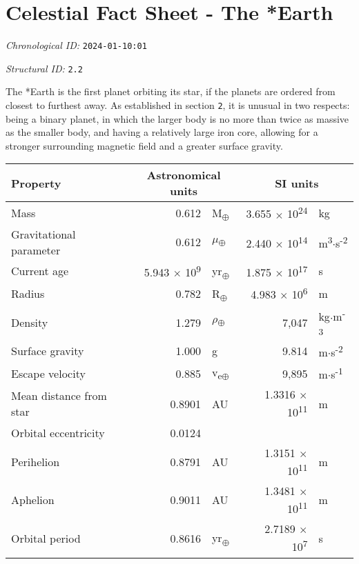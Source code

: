 \section{Celestial Fact Sheet - The *Earth}
\emph{Chronological ID:} \texttt{2024-01-10:01}

\emph{Structural ID:} \texttt{2.2}

The *Earth is the first planet orbiting its star, if the planets are ordered from closest to furthest away. As established in section \texttt{2}, it is unusual in two respects: being a binary planet, in which the larger body is no more than twice as massive as the smaller body, and having a relatively large iron core, allowing for a stronger surrounding magnetic field and a greater surface gravity.

\begin{tabular}{|p{4cm}|r l|r l|}
  \hline
  Property & \multicolumn{2}{c|}{Astronomical units} & \multicolumn{2}{c|}{SI units} \\
  \hline \hline
  Mass & 0.612 & M\textsubscript{$\oplus$} & 3.655 $\times$ 10\textsuperscript{24} & kg \\
  Gravitational parameter & 0.612 & $\mu$\textsubscript{$\oplus$} & 2.440 $\times$ 10\textsuperscript{14} & m\textsuperscript{3}$\cdot$s\textsuperscript{-2} \\
  Current age & 5.943 $\times$ 10\textsuperscript{9} & yr\textsubscript{$\oplus$} & 1.875 $\times$ 10\textsuperscript{17} & s \\
  Radius & 0.782 & R\textsubscript{$\oplus$} & 4.983 $\times$ 10\textsuperscript{6} & m \\
  Density & 1.279 & $\rho$\textsubscript{$\oplus$} & 7,047 & kg$\cdot$m\textsuperscript{-3} \\
  Surface gravity & 1.000 & g & 9.814 & m$\cdot$s\textsuperscript{-2} \\
  Escape velocity & 0.885 & v\textsubscript{e$\oplus$} & 9,895 & m$\cdot$s\textsuperscript{-1} \\
  Mean distance from star & 0.8901 & AU & 1.3316 $\times$ 10\textsuperscript{11} & m \\
  Orbital eccentricity & 0.0124 & & & \\
  Perihelion & 0.8791 & AU & 1.3151 $\times$ 10\textsuperscript{11} & m \\
  Aphelion & 0.9011 & AU & 1.3481 $\times$ 10\textsuperscript{11} & m \\
  Orbital period & 0.8616 & yr\textsubscript{$\oplus$} & 2.7189 $\times$ 10\textsuperscript{7} & s \\

\end{tabular}

